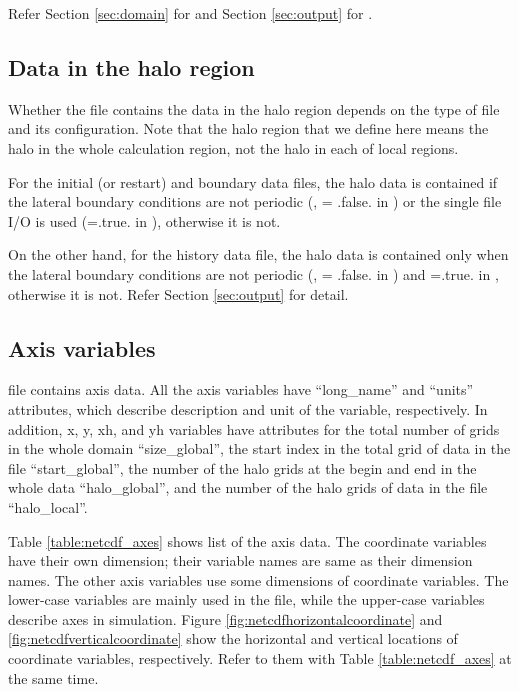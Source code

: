 \noindent Refer Section \ref{sec:domain} for  and
Section \ref{sec:output} for .


\subsection{Data in the halo region}

Whether the file 
contains the data in the halo region
depends on the type of file and its configuration.
Note that the halo region that we define here means the halo in the whole calculation region,
not the halo in each of local regions.

For the initial (or restart) and boundary data files, 
the halo data is contained if the lateral boundary conditions are not periodic 
(,  = .false. in ) 
or the single file I/O is used (=.true. in ),
otherwise it is not.

On the other hand,
for the history data file, 
the halo data is contained 
only when the lateral boundary conditions are not periodic
(,  = .false. in )
and =.true. in ,
otherwise it is not. Refer Section \ref{sec:output} for detail.

\subsection{Axis variables}
\scalenetcdf file contains axis data.
All the axis variables have 
``long\_name'' and ``units'' attributes,
which describe description and unit of the variable, respectively.
In addition, x, y, xh, and yh variables 
have attributes for the total number of grids in the whole domain ``size\_global'',
the start index in the total grid of data in the file ``start\_global'',
the number of the halo grids at the begin and end in the whole data ``halo\_global'',
and the number of the halo grids of data in the file ``halo\_local''.

Table \ref{table:netcdf_axes} shows list of the axis data.
The coordinate variables have their own dimension; their variable names are same as their dimension names.
The other axis variables use some dimensions of coordinate variables.
The lower-case variables are mainly used in the file, 
while the upper-case variables describe axes in simulation.
Figure \ref{fig:netcdfhorizontalcoordinate} and \ref{fig:netcdfverticalcoordinate} show 
the horizontal and vertical locations of coordinate variables,
respectively.
Refer to them with Table \ref{table:netcdf_axes} at the same time.

